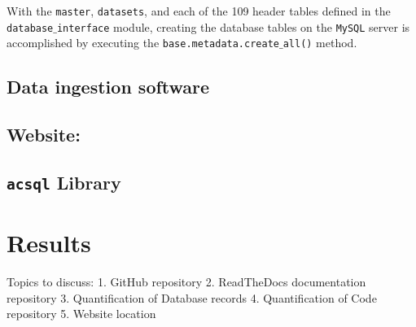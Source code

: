 \documentclass[10pt,journal,compsoc]{IEEEtran}
\begin{document}
With the \texttt{master}, \texttt{datasets}, and each of the 109 header tables defined in the
\texttt{database$\_$interface} module, creating the database tables on the \texttt{MySQL} server
is accomplished by executing the \texttt{base.metadata.create$\_$all()} method.


\subsection{Data ingestion software}

\subsection{Website:}

\subsection{\texttt{acsql} Library}


\section{Results}\label{sec:results}

Topics to discuss:
1. GitHub repository
2. ReadTheDocs documentation repository
3. Quantification of Database records
4. Quantification of Code repository
5. Website location



%
%
\end{document}

